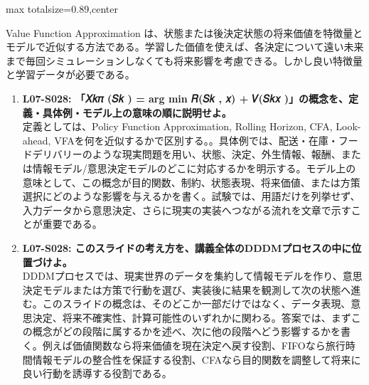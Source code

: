 \begin{minipage}[t]{0.58\textwidth}
\begin{adjustbox}{max totalsize={\textwidth}{0.89\textheight},center}
\begin{minipage}{\textwidth}
Value Function Approximation は、状態または後決定状態の将来価値を特徴量とモデルで近似する方法である。学習した価値を使えば、各決定について遠い未来まで毎回シミュレーションしなくても将来影響を考慮できる。しかし良い特徴量と学習データが必要である。\par{}\begin{enumerate}\item \textbf{L07-S028: 「𝑋𝑘𝜋 (𝑆𝑘 ) = arg min 𝑅(𝑆𝑘 , 𝑥) + 𝑉(𝑆𝑘𝑥 )」の概念を、定義・具体例・モデル上の意味の順に説明せよ。}\\定義としては、Policy Function Approximation, Rolling Horizon, CFA, Look-ahead, VFAを何を近似するかで区別する。。具体例では、配送・在庫・フードデリバリーのような現実問題を用い、状態、決定、外生情報、報酬、または情報モデル/意思決定モデルのどこに対応するかを明示する。モデル上の意味として、この概念が目的関数、制約、状態表現、将来価値、または方策選択にどのような影響を与えるかを書く。試験では、用語だけを列挙せず、入力データから意思決定、さらに現実の実装へつながる流れを文章で示すことが重要である。\item \textbf{L07-S028: このスライドの考え方を、講義全体のDDDMプロセスの中に位置づけよ。}\\DDDMプロセスでは、現実世界のデータを集約して情報モデルを作り、意思決定モデルまたは方策で行動を選び、実装後に結果を観測して次の状態へ進む。このスライドの概念は、そのどこか一部だけではなく、データ表現、意思決定、将来不確実性、計算可能性のいずれかに関わる。答案では、まずこの概念がどの段階に属するかを述べ、次に他の段階へどう影響するかを書く。例えば価値関数なら将来価値を現在決定へ戻す役割、FIFOなら旅行時間情報モデルの整合性を保証する役割、CFAなら目的関数を調整して将来に良い行動を誘導する役割である。\end{enumerate}
\end{minipage}
\end{adjustbox}
\end{minipage}


